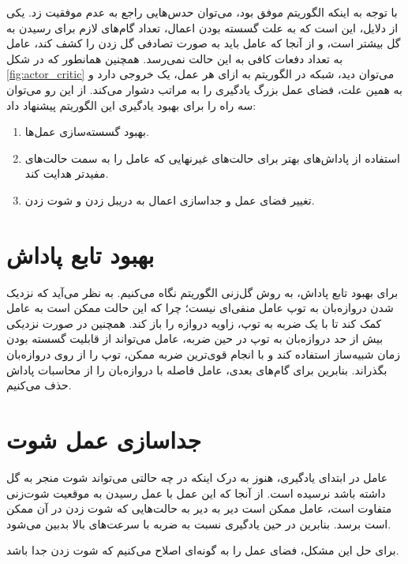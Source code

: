 با توجه به اینکه الگوریتم  موفق بود، می‌توان حدس‌هایی راجع به عدم موفقیت  زد.
یکی از دلایل، این است که به علت گسسته بودن اعمال، تعداد گام‌های لازم برای رسیدن به گل بیشتر است، و از آنجا که عامل باید به صورت تصادفی گل زدن را کشف کند،
عامل به تعداد دفعات کافی به این حالت نمی‌رسد.
همچنین همانطور که در شکل \ref{fig:actor_critic} می‌توان دید، شبکه در الگوریتم
 به ازای هر عمل، یک خروجی دارد و به همین علت، فضای عمل بزرگ یادگیری را به مراتب دشوار می‌کند.
از این رو می‌توان سه راه را برای بهبود یادگیری این الگوریتم پیشنهاد داد:
\begin{enumerate}
    \item بهبود گسسته‌سازی عمل‌ها.
    \item استفاده از پاداش‌های بهتر برای حالت‌های غیرنهایی که عامل را به سمت حالت‌های مفید‌تر هدایت کند.
    \item تغییر فضای عمل و جدا‌سازی اعمال به دریبل‌ زدن و شوت زدن.
\end{enumerate}

\section{بهبود تابع پاداش}
برای بهبود تابع پاداش، به روش گل‌زنی الگوریتم  نگاه می‌کنیم.
به نظر می‌آید که نزدیک شدن دروازه‌بان به توپ عامل منفی‌ای نیست؛ چرا که این حالت ممکن است به عامل کمک کند تا با یک ضربه به توپ، زاویه دروازه را باز کند.
همچنین در صورت نزدیکی بیش از حد دروازه‌بان به توپ در حین ضربه، عامل می‌تواند از قابلیت گسسته بودن زمان شبیه‌ساز استفاده کند و با انجام قوی‌ترین ضربه ممکن، توپ را از روی دروازه‌بان بگذراند.
بنابرین برای گام‌های بعدی، عامل فاصله با دروازه‌بان را از محاسبات پاداش حذف می‌کنیم.


\section{جدا‌سازی عمل شوت}
عامل در ابتدای یادگیری، هنوز به درک اینکه در چه حالتی می‌تواند شوت منجر به گل داشته باشد نرسیده است.
از آنجا که این عمل با عمل رسیدن به موقعیت شوت‌زنی متفاوت است، عامل ممکن است دیر به دیر به حالت‌هایی که شوت زدن در آن ممکن است برسد.
بنابرین در حین یادگیری نسبت به ضربه با سرعت‌های بالا بدبین می‌شود.

برای حل این مشکل، فضای عمل را به گونه‌ای اصلاح می‌کنیم که شوت زدن جدا باشد.
